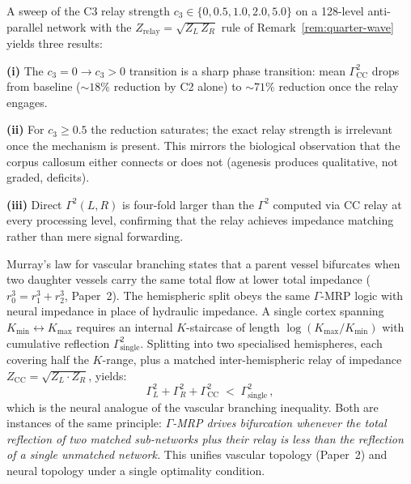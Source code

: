 \documentclass[aps,pre,twocolumn,superscriptaddress,floatfix]{revtex4-2}
\begin{document}
\begin{remark}
\label{rem:c3-verification}
A sweep of the C3 relay strength
$c_3 \in \{0, 0.5, 1.0, 2.0, 5.0\}$ on a 128-level
anti-parallel network with the $Z_{\text{relay}}
= \sqrt{Z_L\,Z_R}$ rule of
Remark~\ref{rem:quarter-wave} yields three results:

\textbf{(i)} The $c_3 = 0 \to c_3 > 0$ transition is a
  sharp phase transition: mean
  $\Gamma^2_{\text{CC}}$ drops from baseline
  ($\sim 18\%$ reduction by C2 alone) to
  $\sim 71\%$ reduction once the relay engages.

\textbf{(ii)} For $c_3 \ge 0.5$ the reduction saturates;
  the exact relay strength is irrelevant once the
  mechanism is present.
  This mirrors the biological observation that the
  corpus callosum either connects or does not
  (agenesis produces qualitative, not graded,
  deficits).

\textbf{(iii)} Direct $\Gamma^2(L, R)$ is four-fold
  larger than the $\Gamma^2$ computed via CC relay
  at every processing level, confirming that the relay
  achieves impedance matching rather than mere
  signal forwarding.
\end{remark}

\begin{remark}
\label{rem:neural-murray}
Murray's law for vascular branching states that a parent
vessel bifurcates when two daughter vessels carry the
same total flow at lower total impedance
($r_0^3 = r_1^3 + r_2^3$, Paper~2).
The hemispheric split obeys the same $\Gamma$-MRP logic
with neural impedance in place of hydraulic impedance.
A single cortex spanning $K_{\min} \leftrightarrow
K_{\max}$ requires an internal $K$-staircase of length
$\log(K_{\max}/K_{\min})$ with cumulative reflection
$\Gamma_{\text{single}}^2$.
Splitting into two specialised hemispheres, each covering
half the $K$-range, plus a matched inter-hemispheric
relay of impedance
$Z_{\text{CC}} = \sqrt{Z_L \cdot Z_R}$, yields:
\begin{equation}
  \Gamma_L^2 + \Gamma_R^2 + \Gamma_{\text{CC}}^2
  \;<\; \Gamma_{\text{single}}^2\,,
  \label{eq:neural-murray}
\end{equation}
which is the neural analogue of the vascular branching
inequality.
Both are instances of the same principle:
\emph{$\Gamma$-MRP drives bifurcation whenever the
total reflection of two matched sub-networks plus
their relay is less than the reflection of a single
unmatched network.}
This unifies vascular topology (Paper~2) and neural
topology under a single optimality condition.
\end{remark}
\end{document}
